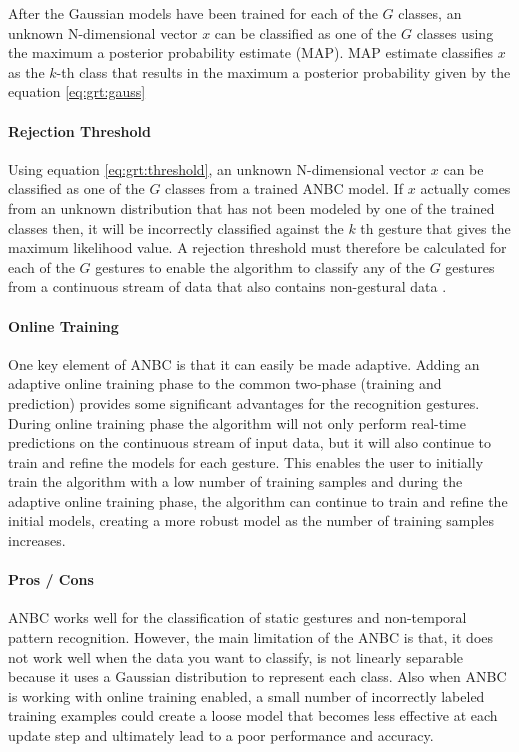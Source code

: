 

After the Gaussian models have been trained for each of the $G$ classes, an unknown N-dimensional vector $x$ can be classified as one of the $G$ classes using the maximum a posterior probability estimate (MAP). MAP estimate classifies $x$ as the $k$-th class that results in the maximum a posterior probability given by the equation \ref{eq:grt:gauss}



\paragraph*{Rejection Threshold} Using equation \ref{eq:grt:threshold}, an unknown N-dimensional vector $x$ can be classified as one of the $G$ classes from a trained ANBC model. If $x$ actually comes from an unknown distribution that has not been modeled by one of the trained classes then, it will be incorrectly classified against the $k$ th gesture that gives the maximum likelihood value. A rejection threshold must therefore be calculated for each of the $G$ gestures to enable the algorithm to classify any of the $G$ gestures from a continuous stream of data that also contains non-gestural data \cite{14}.

\paragraph*{Online Training} One key element of ANBC is that it can easily be made adaptive. Adding an adaptive online training phase to the common two-phase (training and prediction) provides some significant advantages for the recognition gestures. During online training phase the algorithm will not only perform real-time predictions on the continuous stream of input data, but it will also continue to train and refine the models for each gesture. This enables the user to initially train the algorithm with a low number of training samples and during the adaptive online training phase, the algorithm can continue to train and refine the initial models, creating a more robust model as the number of training samples increases.

\paragraph*{Pros / Cons} ANBC works well for the classification of static gestures and non-temporal pattern recognition. However, the main limitation of the ANBC is that, it does not work well when the data you want to classify, is not linearly separable because it uses a Gaussian distribution to represent each class. Also when ANBC is working with online training enabled, a small number of incorrectly labeled training examples could create a loose model that becomes less effective at each update step and ultimately lead to a poor performance and accuracy.

